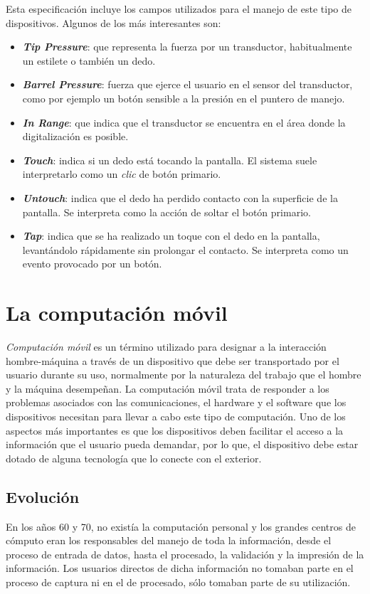 Esta especificación incluye los campos utilizados para el manejo de este tipo 
de dispositivos. Algunos de los más interesantes son:
\begin{itemize}
\item \textbf{\emph{Tip Pressure}}: que representa la fuerza por un 
transductor, habitualmente un estilete o también un dedo.
\item \textbf{\emph{Barrel Pressure}}: fuerza que ejerce el usuario en el 
sensor del transductor, como por ejemplo un botón sensible a la presión en el 
puntero de manejo.
\item \textbf{\emph{In Range}}: que indica que el transductor se encuentra en 
el área donde la digitalización es posible.
\item \textbf{\emph{Touch}}: indica si un dedo está tocando la pantalla. El 
sistema suele interpretarlo como un \emph{clic} de botón primario.
\item \textbf{\emph{Untouch}}: indica que el dedo ha perdido contacto con la 
superficie de la pantalla. Se interpreta como la acción de soltar el botón 
primario.
\item \textbf{\emph{Tap}}: indica que se ha realizado un toque con el dedo en 
la pantalla, levantándolo rápidamente sin prolongar el contacto. Se interpreta 
como un evento provocado por un botón.
\end{itemize}

\section{La computación móvil}
\emph{Computación móvil} es un término utilizado para designar a la interacción
hombre-máquina a través de un dispositivo que debe ser transportado por el
usuario durante su uso, normalmente por la naturaleza del trabajo que el hombre
y la máquina desempeñan. La computación móvil trata de responder a los 
problemas asociados con las comunicaciones, el hardware y el software que
los dispositivos necesitan para llevar a cabo este tipo de computación.
Uno de los aspectos más importantes es que los dispositivos deben facilitar el
acceso a la información que el usuario pueda demandar, por lo que, el
dispositivo debe estar dotado de alguna tecnología que lo conecte con el
exterior.

  \subsection{Evolución}
En los años 60 y 70, no existía la computación personal y los grandes centros
de cómputo eran los responsables del manejo de toda la información, desde
el proceso de entrada de datos, hasta el procesado, la validación y la
impresión de la información. Los usuarios directos de dicha información no
tomaban parte en el proceso de captura ni en el de procesado, sólo tomaban
parte de su utilización.

